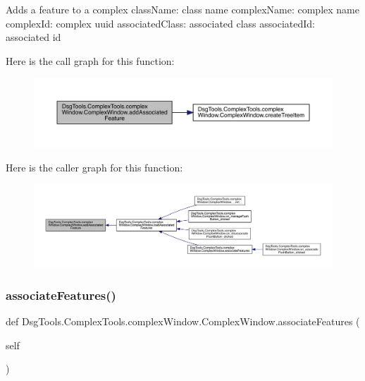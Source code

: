 \begin{DoxyVerb}Adds a feature to a complex
className: class name
complexName: complex name
complexId: complex uuid
associatedClass: associated class
associatedId: associated id
\end{DoxyVerb}
 Here is the call graph for this function\+:
\nopagebreak
\begin{figure}[H]
\begin{center}
\leavevmode
\includegraphics[width=350pt]{class_dsg_tools_1_1_complex_tools_1_1complex_window_1_1_complex_window_a4f094ed4f9f97ce5e04041e2a84487b2_cgraph}
\end{center}
\end{figure}
Here is the caller graph for this function\+:
\nopagebreak
\begin{figure}[H]
\begin{center}
\leavevmode
\includegraphics[width=350pt]{class_dsg_tools_1_1_complex_tools_1_1complex_window_1_1_complex_window_a4f094ed4f9f97ce5e04041e2a84487b2_icgraph}
\end{center}
\end{figure}
\mbox{\label{class_dsg_tools_1_1_complex_tools_1_1complex_window_1_1_complex_window_ad3f85f69aac90814bff6d8c3bf08d3f0}} 
\subsubsection{\texorpdfstring{associate\+Features()}{associateFeatures()}}
{\footnotesize\ttfamily def Dsg\+Tools.\+Complex\+Tools.\+complex\+Window.\+Complex\+Window.\+associate\+Features (\begin{DoxyParamCaption}\item[{}]{self }\end{DoxyParamCaption})}

